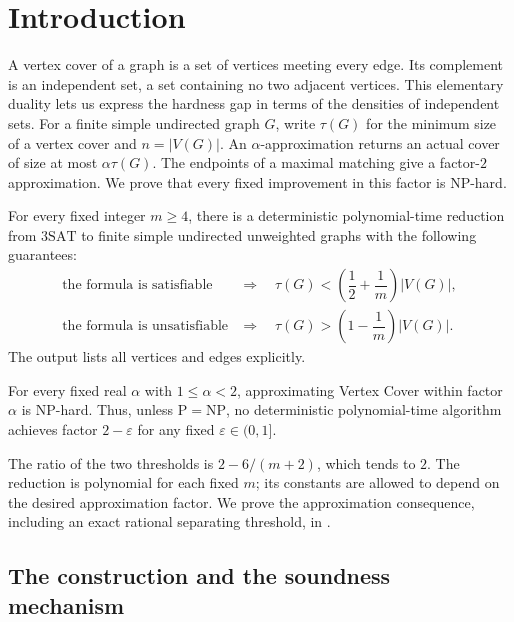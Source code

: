 \section{Introduction}
\label{sec:introduction}

A vertex cover of a graph is a set of vertices meeting every edge.
Its complement is an independent set, a set containing no two adjacent
vertices. This elementary duality lets us express the hardness gap
in terms of the densities of independent sets.
For a finite simple undirected graph \(G\), write \(\tau(G)\) for
the minimum size of a vertex cover and \(n=|V(G)|\). An
\(\alpha\)-approximation returns an actual cover of size at most
\(\alpha\tau(G)\). The endpoints of a maximal matching give a
factor-\(2\) approximation. We prove that every fixed improvement
in this factor is NP-hard.

\begin{theorem}
\label{thm:gap}
For every fixed integer \(m\geq4\), there is a deterministic
polynomial-time reduction from \(\mathrm{3SAT}\) to finite simple
undirected unweighted graphs with the following guarantees:
\[
\begin{array}{ll}
\text{the formula is satisfiable}
 &\Longrightarrow\quad
 \tau(G)<\left(\dfrac12+\dfrac1m\right)|V(G)|,\\[6pt]
\text{the formula is unsatisfiable}
 &\Longrightarrow\quad
 \tau(G)>\left(1-\dfrac1m\right)|V(G)|.
\end{array}
\]
The output lists all vertices and edges explicitly.
\end{theorem}

\begin{corollary}
\label{thm:hardness}
For every fixed real \(\alpha\) with \(1\leq\alpha<2\),
approximating Vertex Cover within factor \(\alpha\) is NP-hard.
Thus, unless \(\mathrm P=\mathrm{NP}\), no deterministic
polynomial-time algorithm achieves factor \(2-\varepsilon\)
for any fixed \(\varepsilon\in(0,1]\).
\end{corollary}

The ratio of the two thresholds is \(2-6/(m+2)\), which tends to
\(2\). The reduction is polynomial for each fixed \(m\); its
constants are allowed to depend on the desired approximation factor.
We prove the approximation consequence, including an exact rational
separating threshold, in .



\subsection{The construction and the soundness mechanism}

